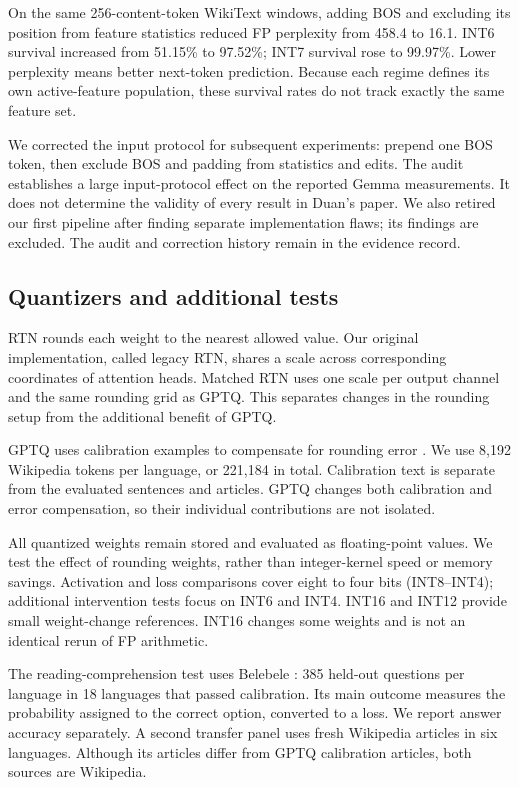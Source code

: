 \documentclass[11pt]{article}
\begin{document}
On the same 256-content-token WikiText windows, adding BOS and excluding its position from feature statistics reduced FP perplexity from 458.4 to 16.1. INT6 survival increased from 51.15\% to 97.52\%; INT7 survival rose to 99.97\%. Lower perplexity means better next-token prediction. Because each regime defines its own active-feature population, these survival rates do not track exactly the same feature set.

We corrected the input protocol for subsequent experiments: prepend one BOS token, then exclude BOS and padding from statistics and edits. The audit establishes a large input-protocol effect on the reported Gemma measurements. It does not determine the validity of every result in Duan's paper. We also retired our first pipeline after finding separate implementation flaws; its findings are excluded. The audit and correction history remain in the evidence record.

\subsection{Quantizers and additional tests}
RTN rounds each weight to the nearest allowed value. Our original implementation, called legacy RTN, shares a scale across corresponding coordinates of attention heads. Matched RTN uses one scale per output channel and the same rounding grid as GPTQ. This separates changes in the rounding setup from the additional benefit of GPTQ.

GPTQ uses calibration examples to compensate for rounding error \citep{frantar2023gptq}. We use 8,192 Wikipedia tokens per language, or 221,184 in total. Calibration text is separate from the evaluated sentences and articles. GPTQ changes both calibration and error compensation, so their individual contributions are not isolated.

All quantized weights remain stored and evaluated as floating-point values. We test the effect of rounding weights, rather than integer-kernel speed or memory savings. Activation and loss comparisons cover eight to four bits (INT8--INT4); additional intervention tests focus on INT6 and INT4. INT16 and INT12 provide small weight-change references. INT16 changes some weights and is not an identical rerun of FP arithmetic.

The reading-comprehension test uses Belebele \citep{bandarkar-etal-2024-belebele}: 385 held-out questions per language in 18 languages that passed calibration. Its main outcome measures the probability assigned to the correct option, converted to a loss. We report answer accuracy separately. A second transfer panel uses fresh Wikipedia articles in six languages. Although its articles differ from GPTQ calibration articles, both sources are Wikipedia.
\end{document}

